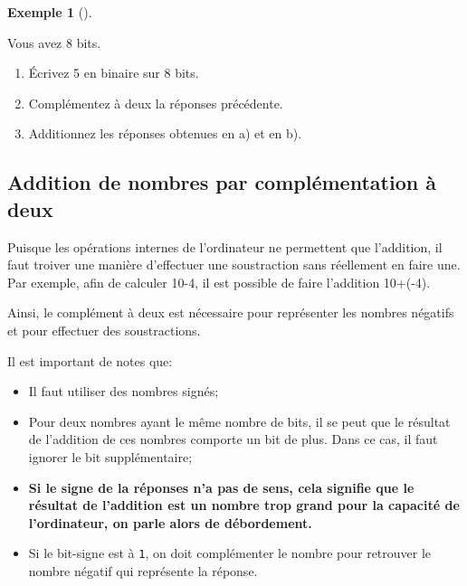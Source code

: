 \documentclass[
  letterpaper,
]{scrbook}
\providecommand{\tightlist}{%
  \setlength{\itemsep}{0pt}\setlength{\parskip}{0pt}}\usepackage{longtable,booktabs,array}
\theoremstyle{plain}
\theoremstyle{definition}
\newtheorem{example}{Exemple}[chapter]
\theoremstyle{definition}
\theoremstyle{remark}
\begin{document}
\leavevmode{}%
\begin{example}[]\label{exm-valeur-5-8-bits}

Vous avez 8 bits.

\begin{enumerate}
\def\labelenumi{\alph{enumi})}
\tightlist
\item
  Écrivez 5 en binaire sur 8 bits.
\item
  Complémentez à deux la réponses précédente.
\item
  Additionnez les réponses obtenues en a) et en b).
\end{enumerate}

\end{example}

\hypertarget{addition-de-nombres-par-compluxe9mentation-uxe0-deux}{%
\subsection{Addition de nombres par complémentation à
deux}\label{addition-de-nombres-par-compluxe9mentation-uxe0-deux}}

Puisque les opérations internes de l'ordinateur ne permettent que
l'addition, il faut troiver une manière d'effectuer une soustraction
sans réellement en faire une. Par exemple, afin de calculer 10-4, il est
possible de faire l'addition 10+(-4).

Ainsi, le complément à deux est nécessaire pour représenter les nombres
négatifs et pour effectuer des soustractions.

\begin{tcolorbox}[enhanced jigsaw, opacityback=0, rightrule=.15mm, breakable, toprule=.15mm, colbacktitle=quarto-callout-important-color!10!white, title=\textcolor{quarto-callout-important-color}{\faExclamation}\hspace{0.5em}{Important}, titlerule=0mm, arc=.35mm, colback=white, coltitle=black, colframe=quarto-callout-important-color-frame, bottomtitle=1mm, toptitle=1mm, bottomrule=.15mm, leftrule=.75mm, left=2mm, opacitybacktitle=0.6]

Il est important de notes que:

\begin{itemize}
\tightlist
\item
  Il faut utiliser des nombres signés;
\item
  Pour deux nombres ayant le même nombre de bits, il se peut que le
  résultat de l'addition de ces nombres comporte un bit de plus. Dans ce
  cas, il faut ignorer le bit supplémentaire;
\item
  \textbf{Si le signe de la réponses n'a pas de sens, cela signifie que
  le résultat de l'addition est un nombre trop grand pour la capacité de
  l'ordinateur, on parle alors de débordement.}
\item
  Si le bit-signe est à \texttt{1}, on doit complémenter le nombre pour
  retrouver le nombre négatif qui représente la réponse.
\end{itemize}

\end{tcolorbox}
\end{document}
